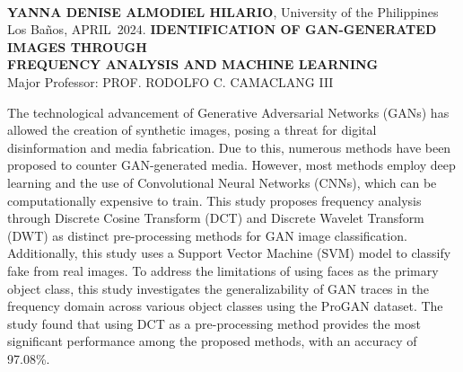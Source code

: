 \documentclass{icsthesis}
\renewcommand{\AUTHOR}{YANNA DENISE ALMODIEL HILARIO}
\renewcommand{\MONTH}{APRIL}
\renewcommand{\YEAR}{2024}
\begin{document}
\begin{frontmatter}
		
		\begin{abstractwithpageno}	
		\\
		\textbf{\AUTHOR}, University of the Philippines Los Ba\~{n}os, \MONTH\ \YEAR. \textbf{IDENTIFICATION OF GAN-GENERATED IMAGES THROUGH \\FREQUENCY ANALYSIS AND MACHINE LEARNING}
		\\Major Professor: PROF. RODOLFO C. CAMACLANG III\\
        
        \par The technological advancement of Generative Adversarial Networks (GANs) has allowed the creation of synthetic images, posing a threat for digital disinformation and media fabrication. Due to this, numerous methods have been proposed to counter GAN-generated media. However, most methods employ deep learning and the use of Convolutional Neural Networks (CNNs), which can be computationally expensive to train. This study proposes frequency analysis through Discrete Cosine Transform (DCT) and Discrete Wavelet Transform (DWT) as distinct pre-processing methods for GAN image classification. Additionally, this study uses a Support Vector Machine (SVM) model to classify fake from real images. To address the limitations of using faces as the primary object class, this study investigates the generalizability of GAN traces in the frequency domain across various object classes using the ProGAN dataset. The study found that using DCT as a pre-processing method provides the most significant performance among the proposed methods, with an accuracy of 97.08\%.
		\end{abstractwithpageno}

	\end{frontmatter}
	
\end{document}
